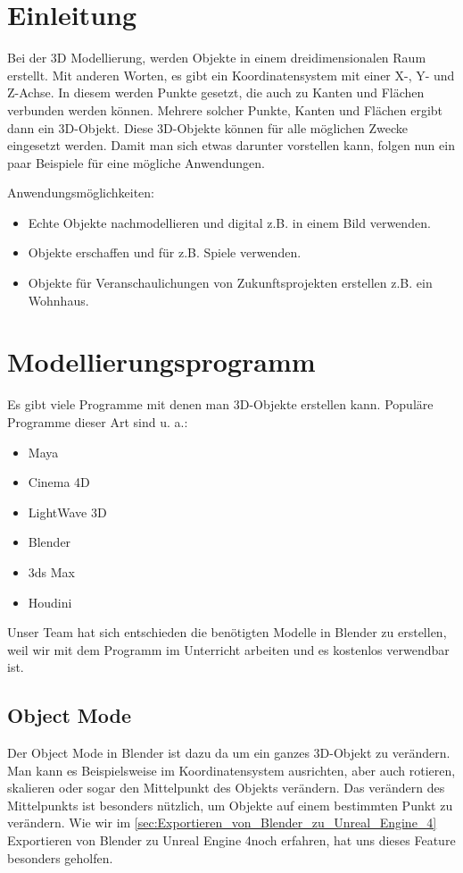 \section{Einleitung}
Bei der 3D Modellierung, werden Objekte in einem dreidimensionalen Raum erstellt. Mit anderen Worten, es gibt ein Koordinatensystem mit einer X-, Y- und Z-Achse.
In diesem werden Punkte gesetzt, die auch zu Kanten und Flächen verbunden werden können. Mehrere solcher Punkte, Kanten und Flächen ergibt dann ein 3D-Objekt.
Diese 3D-Objekte können für alle möglichen Zwecke eingesetzt werden. Damit man sich etwas darunter vorstellen kann, folgen nun ein paar Beispiele für
eine mögliche Anwendungen.

Anwendungsmöglichkeiten:
\begin{itemize}
    \item Echte Objekte nachmodellieren und digital z.B. in einem Bild verwenden.
    \item Objekte erschaffen und für z.B. Spiele verwenden.
    \item Objekte für Veranschaulichungen von Zukunftsprojekten erstellen z.B. ein Wohnhaus.
\end{itemize}

\section{Modellierungsprogramm}
Es gibt viele Programme mit denen man 3D-Objekte erstellen kann.
\citep{wiki:modellierungsprogramm_beispiele} Populäre Programme dieser Art sind u. a.:

\begin{itemize}
    \item Maya
    \item Cinema 4D
    \item LightWave 3D
    \item Blender
    \item 3ds Max
    \item Houdini
\end{itemize}

Unser Team hat sich entschieden die benötigten Modelle in Blender zu erstellen, weil wir mit dem Programm im Unterricht arbeiten und
es kostenlos verwendbar ist.


\subsection{Object Mode}
Der Object Mode in Blender ist dazu da um ein ganzes 3D-Objekt zu verändern. Man kann es Beispielsweise im Koordinatensystem ausrichten, aber
auch rotieren, skalieren oder sogar den Mittelpunkt des Objekts verändern. Das verändern des Mittelpunkts ist besonders nützlich, um Objekte auf
einem bestimmten Punkt zu verändern. Wie wir im \autoref{sec:Exportieren_von_Blender_zu_Unreal_Engine_4} \dq  Exportieren von Blender zu Unreal Engine 4\dq noch erfahren, hat uns dieses Feature besonders geholfen.


